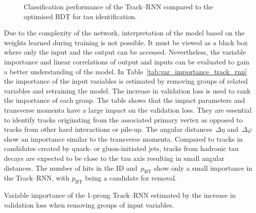 \begin{figure}[htb]
\begin{subfigure}[t]{0.48\textwidth}
  \end{subfigure}
  \caption[Comparison of the classification performance of Track--RNN and
  optimised BDT]{Classification performance of the Track--RNN compared to the
    optimised BDT for tau identification.}
  \label{fig:track_rnn_roc_ratios}
\end{figure}

Due to the complexity of the network, interpretation of the model based on the
weights learned during training is not possible. It must be viewed as a black
box where only the input and the output can be accessed. Nevertheless, the
variable importance and linear correlations of output and inputs can be
evaluated to gain a better understanding of the model. In
Table~\ref{tab:var_importance_track_rnn} the importance of the input variables
is estimated by removing groups of related variables and retraining the model.
The increase in validation loss is used to rank the importance of each group.
The table shows that the impact parameters and transverse momenta have a large
impact on the validation loss. They are essential to identify tracks originating
from the associated primary vertex as opposed to tracks from other hard
interactions or pile-up. The angular distances~$\Delta \eta$
and~$\Delta \varphi$ show an importance similar to the transverse momenta.
Compared to tracks in \tauhadvis candidates created by quark- or gluon-initiated
jets, tracks from hadronic tau decays are expected to be close to the tau axis
resulting in small angular distances. The number of hits in the ID
and~$p_\text{HT}$ show only a small importance in the Track--RNN, with
$p_\text{HT}$ being a candidate for removal.

\begin{table}[htb]
  \centering
  {\small}
  \caption[Variable importance of the 1-prong Track--RNN]{Variable importance of
    the 1-prong Track--RNN estimated by the increase in validation loss when
    removing groups of input variables.}
  \label{tab:var_importance_track_rnn}
\end{table}

